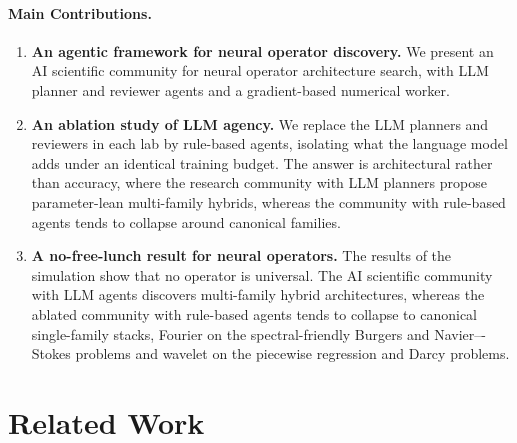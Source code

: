 \documentclass{article}
\begin{document}
\paragraph{Main Contributions.}
\begin{enumerate}[leftmargin=1.5em,itemsep=2pt]
\item \textbf{An agentic framework for neural operator discovery.} We present an AI scientific community for neural operator architecture search, with LLM planner and
reviewer agents and a gradient-based numerical worker.
\item \textbf{An ablation study of LLM agency.} We replace the LLM planners and reviewers in each lab by rule-based agents, isolating
what the language model adds under an identical training budget. The answer is
architectural rather than accuracy, where the research community with LLM planners propose parameter-lean multi-family
hybrids, whereas the community with rule-based agents tends to collapse around canonical families. %
\item \textbf{A no-free-lunch result for neural operators.} The results of the simulation show that no operator is universal. The AI scientific community with LLM agents discovers multi-family hybrid architectures, whereas the ablated community with rule-based agents tends to collapse to canonical single-family stacks, Fourier on the spectral-friendly Burgers and Navier–-Stokes problems and wavelet on the piecewise regression and Darcy problems. %
\end{enumerate}

\section{Related Work}
\end{document}

